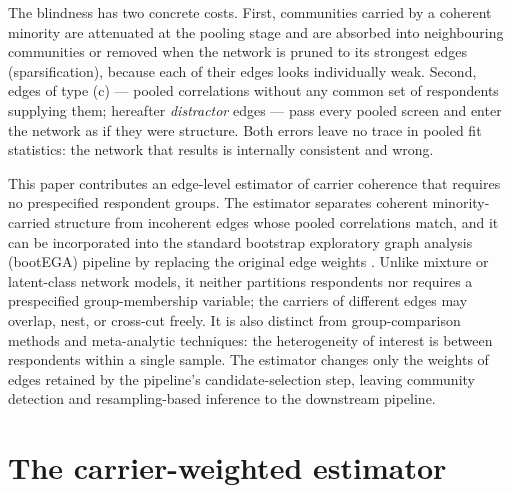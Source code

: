 \documentclass[11pt]{article}
\begin{document}
The blindness has two concrete costs. First, communities carried by a
coherent minority are attenuated at the pooling stage and are absorbed into
neighbouring communities or removed when the network is pruned to its
strongest edges (sparsification), because each of their edges looks
individually weak. Second, edges of type (c) --- pooled
correlations without any common set of respondents supplying them;
hereafter \emph{distractor} edges --- pass every pooled screen and
enter the network as if they were structure. Both errors leave no trace in
pooled fit statistics: the network that results is internally consistent and
wrong.

This paper contributes an edge-level estimator of carrier coherence that
requires no prespecified respondent groups. The estimator separates
coherent minority-carried structure from incoherent edges whose pooled
correlations match, and it can be incorporated into the standard bootstrap
exploratory graph analysis (bootEGA) pipeline by replacing the original
edge weights \citep{christensen2021}. Unlike mixture or
latent-class network models, it neither partitions respondents nor requires a
prespecified group-membership variable; the carriers of different edges may
overlap, nest, or cross-cut freely. It is also distinct from group-comparison
methods \citep{jamison2024} and meta-analytic techniques: the heterogeneity of
interest is between respondents within a single sample. The estimator changes
only the weights of edges retained by the pipeline's candidate-selection
step, leaving community detection and resampling-based inference to the
downstream pipeline.

\section{The carrier-weighted estimator}\label{sec:estimator}
\end{document}
